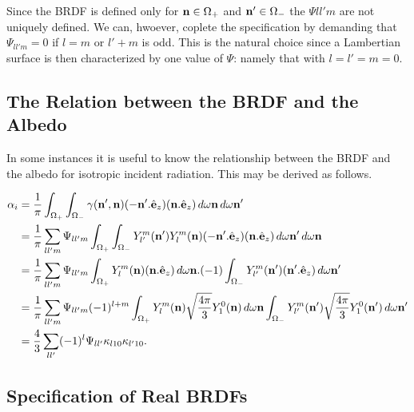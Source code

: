 Since the BRDF is defined only for $\mathbf{n} \in \Omega_+$ and $\mathbf{n}' \in \Omega_-$
the $\Psi{ll'm}$ are not uniquely defined. We can, hwoever, coplete the
specification by demanding that $\Psi_{ll'm}=0$ if $l=m$ or $l'+m$ is odd.
This is the natural choice since a Lambertian surface is then characterized
by one value of $\Psi$: namely that with $l=l'=m=0$.

\subsection{The Relation between the BRDF and the Albedo}

In some instances it is useful to know the relationship between the
BRDF and the albedo for isotropic incident radiation. This may be derived 
as follows.

\begin{equation}
\begin{split}
\alpha_i &= {1\over \pi} \int_{\Omega_+} \int_{\Omega_-} \gamma ( \mathbf{n}' , \mathbf{n})
(-\mathbf{n}' . \hat {\bf e}_z ) (\mathbf{n} . \hat {\bf e}_z ) \, d\omega{\mathbf{n}} \,
d\omega{\mathbf{n}'} \\
&= {1\over \pi} \sum_{ll'm} \Psi_{ll'm} \int_{\Omega_+} \int_{\Omega_-}
Y_{l'}^m (\mathbf{n}') Y_l^m (\mathbf{n}) (-\mathbf{n}' . \hat {\bf e}_z ) (\mathbf{n} . \hat {\bf e}_z ) 
\, d\omega{\mathbf{n}'} \, d\omega{\mathbf{n}} \\
&= {1\over \pi} \sum_{ll'm} \Psi_{ll'm} \int_{\Omega_+} Y_l^m (\mathbf{n})
(\mathbf{n} . \hat {\bf e}_z ) \, d\omega{\mathbf{n}}. (-1) \int_{\Omega_-} Y_{l'}^m (\mathbf{n}') 
(\mathbf{n}' . \hat {\bf e}_z) \, d\omega{\mathbf{n}'} \\
&= {1\over \pi} \sum_{ll'm} \Psi_{ll'm} (-1)^{l+m} \int_{\Omega_+} Y_l^m (\mathbf{n})
\sqrt{{{4\pi}\over 3}} Y_1^0(\mathbf{n}) \, d\omega{\mathbf{n}} \int_{\Omega_-}
Y_{l'}^m (\mathbf{n}') \sqrt{{{4\pi}\over 3}} Y_1^0(\mathbf{n}') \, d\omega{\mathbf{n}'} \\
&= {4\over 3} \sum_{ll'} (-1)^l \Psi_{ll'} \kappa_{l10} \kappa_{l'10}.
\end{split}
\end{equation}




\subsection{Specification of Real BRDFs}

